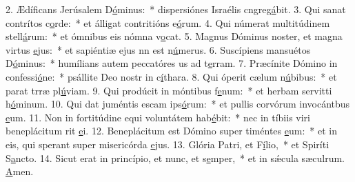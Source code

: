 2. Ædíficans Jerúsalem D\uline{ó}minus:~* dispersiónes Israélis cngreg\uline{á}bit.
3. Qui sanat contrítos c\uline{o}rde:~* et álligat contritións e\uline{ó}rum.
4. Qui númerat multitúdinem stell\uline{á}rum:~* et ómnibus eis nómna v\uline{o}cat.
5. Magnus Dóminus noster, et magna virtus \uline{e}jus:~* et sapiéntiæ ejus nn est n\uline{ú}merus.
6. Suscípiens mansuétos D\uline{ó}minus:~* humílians autem peccatóres us ad t\uline{e}rram.
7. Præcínite Dómino in confessi\uline{ó}ne:~* psállite Deo nostr in c\uline{í}thara.
8. Qui óperit cælum n\uline{ú}bibus:~* et parat trræ pl\uline{ú}viam.
9. Qui prodúcit in móntibus f\uline{e}num:~* et herbam servitti h\uline{ó}minum.
10. Qui dat juméntis escam ips\uline{ó}rum:~* et pullis corvórum invocántbus \uline{e}um.
11. Non in fortitúdine equi voluntátem hab\uline{é}bit:~* nec in tíbiis viri beneplácitum rit \uline{e}i.
12. Beneplácitum est Dómino super timéntes \uline{e}um:~* et in eis, qui sperant super misericórda \uline{e}jus.
13. Glória Patri, et F\uline{í}lio,~* et Spiríti S\uline{a}ncto.
14. Sicut erat in princípio, et nunc, et s\uline{e}mper,~* et in sǽcula sæculrum. \uline{A}men.
